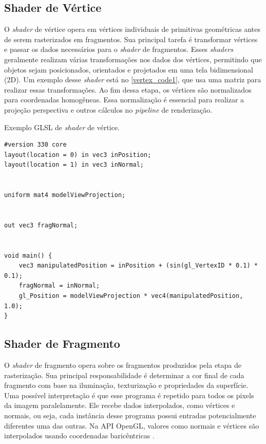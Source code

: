 \documentclass[english, 
               brazil, 
               bsc] %
               {dcomp-abntex2}
\begin{document}
\subsection{Shader de Vértice}


O \textit{shader} de vértice opera em vértices individuais de primitivas geométricas antes de serem rasterizados em fragmentos. Sua principal tarefa é transformar vértices e passar os dados necessários para o \textit{shader} de fragmentos. Esses \textit{shaders} geralmente realizam várias transformações nos dados dos vértices, permitindo que objetos sejam posicionados, orientados e projetados em uma tela bidimensional (2D). Um exemplo desse \textit{shader} está no \autoref{vertex_code1}, que usa uma matriz para realizar essas transformações. Ao fim dessa etapa, os vértices são normalizados para coordenadas homogêneas. Essa normalização é essencial para realizar a projeção perspectiva e outros cálculos no \textit{pipeline} de renderização.




\begin{codigo}[H]
  \caption{\small Exemplo GLSL de \textit{shader} de vértice.}
 \label{vertex_code1}
\begin{lstlisting}
#version 330 core
layout(location = 0) in vec3 inPosition;
layout(location = 1) in vec3 inNormal;


uniform mat4 modelViewProjection;


out vec3 fragNormal;


void main() {
    vec3 manipulatedPosition = inPosition + (sin(gl_VertexID * 0.1) * 0.1);
    fragNormal = inNormal;
    gl_Position = modelViewProjection * vec4(manipulatedPosition, 1.0);
}
\end{lstlisting}
\end{codigo}


\subsection{Shader de Fragmento}


O \textit{shader} de fragmento opera sobre os fragmentos produzidos pela etapa de rasterização. Sua principal responsabilidade é determinar a cor final de cada fragmento com base na iluminação, texturização e propriedades da superfície. Uma possível interpretação é que esse programa é repetido para todos os pixels da imagem paralelamente.  Ele recebe dados interpolados, como vértices e normais, ou seja, cada instância desse programa possui entradas potencialmente diferentes uma das outras. Na API OpenGL, valores como normais e vértices são interpolados usando coordenadas baricêntricas \cite{opengl_interpolation}.
\end{document}
